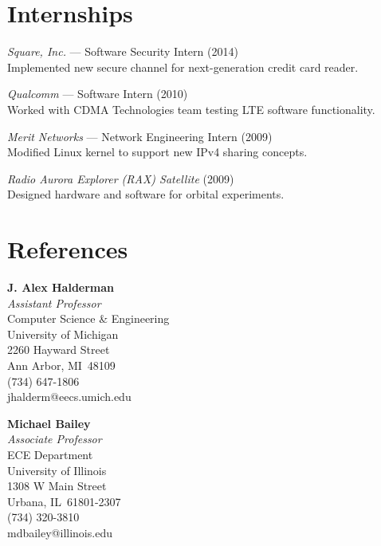 \documentclass[margin,11pt]{res} %
\begin{document}
\vspace{6pt}
\section{\large Internships}

    \emph{Square, Inc.} --- Software Security Intern (2014) \\
    Implemented new secure channel for next-generation credit card reader.
    
    \emph{Qualcomm} --- Software Intern (2010) \\
    Worked with CDMA Technologies team testing LTE software functionality.
    
    \emph{Merit Networks} --- Network Engineering Intern (2009) \\
    Modified Linux kernel to support new IPv4 sharing concepts.

    \emph{Radio Aurora Explorer (RAX) Satellite} (2009) \\
    Designed hardware and software for orbital experiments.
\fi



\section{\large References}
    
\textbf{J. Alex Halderman}\\
\emph{Assistant Professor}\smallskip\\
Computer Science \& Engineering\\
University of Michigan\\
2260 Hayward Street\\
Ann Arbor, MI \,48109\\
(734) 647-1806\\
jhalderm@eecs.umich.edu
\vspace{6pt}

\textbf{Michael Bailey}\\
    \emph{Associate Professor}\smallskip\\
    {ECE Department\\
    University of Illinois\\
    1308 W Main Street \\
    Urbana, IL \,61801-2307\\
     (734) 320-3810\\
    mdbailey@illinois.edu}
\vspace{6pt}
\end{document}
